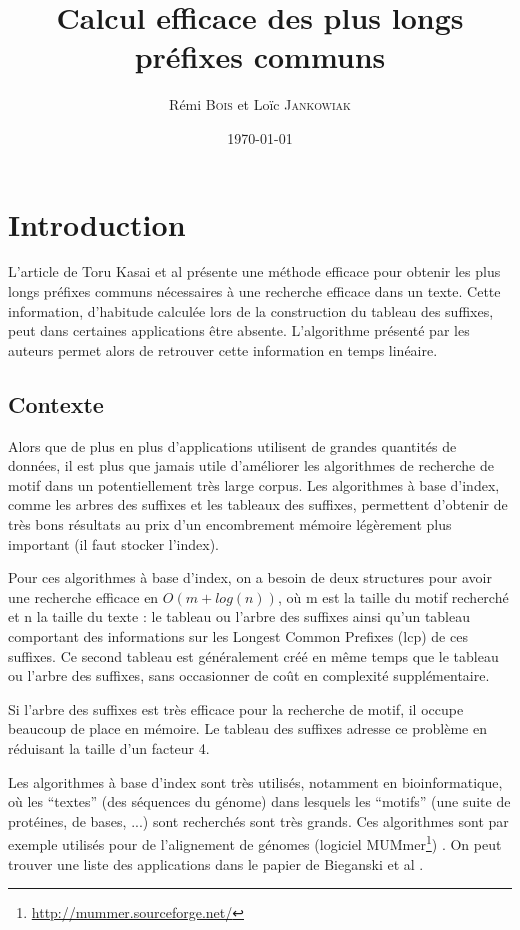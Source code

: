 \documentclass[a4paper,11pt]{article}
\title{Calcul efficace des plus longs préfixes communs}
\author{Rémi \textsc{Bois} et Loïc \textsc{Jankowiak}}
\date{\today}
\begin{document}
\maketitle


\section{Introduction}
\label{sec:intro}

L'article de Toru Kasai et al \cite{Kasai01} présente une méthode efficace pour
obtenir les plus longs préfixes communs nécessaires à une recherche
efficace dans un texte. Cette information, d'habitude calculée lors de
la construction du tableau des suffixes, peut dans certaines
applications être absente. L'algorithme présenté par les auteurs
permet alors de retrouver cette information en temps linéaire.


\subsection{Contexte}
\label{sec:context}

Alors que de plus en plus d'applications utilisent de grandes
quantités de données, il est plus que jamais utile d'améliorer les
algorithmes de recherche de motif dans un potentiellement très large
corpus. Les algorithmes à base d'index, comme les arbres des suffixes
et les tableaux des suffixes, permettent d'obtenir de très bons
résultats au prix d'un encombrement mémoire légèrement plus important
(il faut stocker l'index).

Pour ces algorithmes à base d'index, on a besoin de deux structures
pour avoir une recherche efficace en $O(m+ log(n))$, où m est la
taille du motif recherché et n la taille du texte : le tableau ou
l'arbre des suffixes ainsi qu'un tableau comportant des informations
sur les Longest Common Prefixes (lcp) de ces suffixes. Ce second
tableau est généralement créé en même temps que le tableau ou l'arbre des
suffixes, sans occasionner de coût en complexité supplémentaire.

Si l'arbre des suffixes est très efficace pour la recherche de motif,
il occupe beaucoup de place en mémoire. Le tableau des suffixes
adresse ce problème en réduisant la taille d'un facteur 4.

Les algorithmes à base d'index sont très utilisés, notamment en
bioinformatique, où les ``textes'' (des séquences du génome) dans
lesquels les ``motifs'' (une suite de protéines, de bases, ...) sont
recherchés sont très grands. Ces algorithmes sont par exemple utilisés
pour de l'alignement de génomes (logiciel
MUMmer\footnote{\url{http://mummer.sourceforge.net/}})
\cite{Kurtz04}. On peut trouver une liste des applications dans le
papier de Bieganski et al \cite{Bieganski94}.
\end{document}
